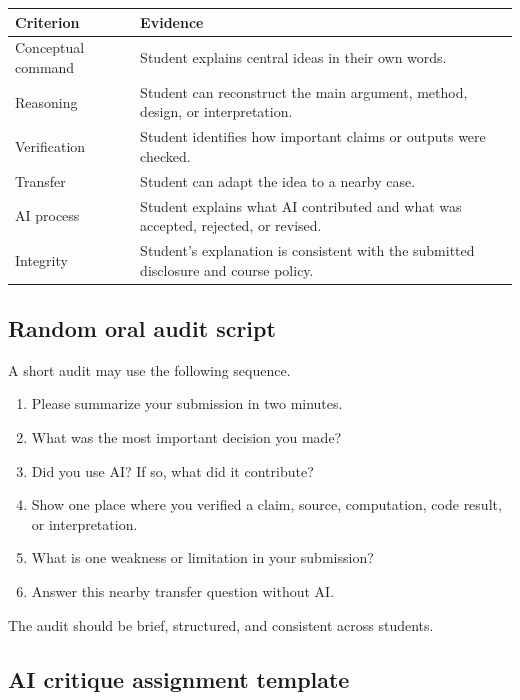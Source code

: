\documentclass{SIAMbook2023}
\begin{document}
\begin{center}
\begin{tabular}{p{}p{}}
\toprule
\textbf{Criterion} & \textbf{Evidence} \\
\midrule
Conceptual command & Student explains central ideas in their own words. \\
Reasoning & Student can reconstruct the main argument, method, design, or interpretation. \\
Verification & Student identifies how important claims or outputs were checked. \\
Transfer & Student can adapt the idea to a nearby case. \\
AI process & Student explains what AI contributed and what was accepted, rejected, or revised. \\
Integrity & Student's explanation is consistent with the submitted disclosure and course policy. \\
\bottomrule
\end{tabular}
\end{center}

\subsection{Random oral audit script}
\label{i:app:audit-script}

A short audit may use the following sequence.

\begin{enumerate}
\item Please summarize your submission in two minutes.
\item What was the most important decision you made?
\item Did you use AI? If so, what did it contribute?
\item Show one place where you verified a claim, source, computation, code result, or interpretation.
\item What is one weakness or limitation in your submission?
\item Answer this nearby transfer question without AI.
\end{enumerate}

The audit should be brief, structured, and consistent across students.

\subsection{AI critique assignment template}
\label{i:app:critique-template}
\end{document}
